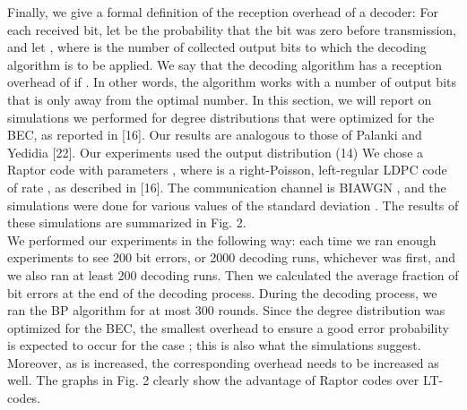 Finally, we give a formal definition of the reception overhead
of a decoder: For each received bit, let be the probability
that the bit was zero before transmission, and let
, where is the number of collected output
bits to which the decoding algorithm is to be applied. We say
that the decoding algorithm has a reception overhead of if
. In other words, the algorithm works with a
number of output bits that is only away from the optimal
number.
In this section, we will report on simulations we performed
for degree distributions that were optimized for the BEC, as reported
in [16]. Our results are analogous to those of Palanki and
Yedidia [22].
Our experiments used the output distribution
(14)
We chose a Raptor code with parameters ,
where is a right-Poisson, left-regular LDPC code of rate
, as described in [16]. The communication channel is
BIAWGN , and the simulations were done for various values
of the standard deviation . The results of these simulations are
summarized in Fig. 2.\\
We performed our experiments in the following way: each
time we ran enough experiments to see 200 bit errors, or 2000
decoding runs, whichever was first, and we also ran at least 200
decoding runs. Then we calculated the average fraction of bit
errors at the end of the decoding process. During the decoding
process, we ran the BP algorithm for at most 300 rounds.
Since the degree distribution was optimized for the BEC, the
smallest overhead to ensure a good error probability is expected
to occur for the case ; this is also what the simulations
suggest. Moreover, as is increased, the corresponding overhead
needs to be increased as well.
The graphs in Fig. 2 clearly show the advantage of Raptor
codes over LT-codes.
